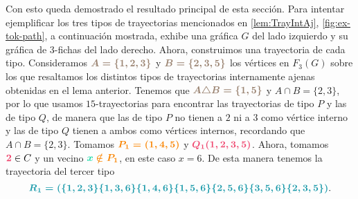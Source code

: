 Con esto queda demostrado el resultado principal de esta secci\'on. Para
intentar ejemplificar los tres tipos de trayectorias mencionados en
\cref{lem:TrayIntAj}, \cref{fig:ex-tok-path}, a continuaci\'on mostrada, exhibe
una gr\'afica $G$ del lado izquierdo y su gr\'afica de $3$-fichas del lado
derecho. Ahora, construimos una trayectoria de cada tipo. Consideramos
${\color{baige}\boldsymbol {A= \{1,2,3\}}}$ y ${\color{baige}\boldsymbol
{B=\{2,3,5\}}}$ los v\'ertices en $F_3(G)$ sobre los que resaltamos los
distintos tipos de trayectorias internamente ajenas obtenidas en el lema
anterior. Tenemos que ${\color{baige} \boldsymbol {A\triangle B=\{1,5\}}}$ y
$A\cap B=\{2,3\}$, por lo que usamos $15$-trayectorias para encontrar las
trayectorias de tipo $P$ y las de tipo $Q$, de manera que las de tipo $P$ no
tienen a $2$ ni a $3$ como v\'ertice interno y las de tipo $Q$ tienen a ambos
como v\'ertices internos, recordando que $A\cap B=\{2,3\}$. Tomamos
${\color{naranja}\boldsymbol {P_1=(1,4,5)}}$ y ${\color{fushia}\boldsymbol
{Q_1(1,2,3,5)}}$. Ahora, tomamos ${\color{fushia}\boldsymbol {2}} \in C$ y un
vecino ${\color{menta}\boldsymbol {x} \color{naranja}\boldsymbol {\notin P_1}}$,
en este caso $x=6$. De esta manera tenemos la trayectoria del tercer tipo
\[
    {\color{verdeAzulado}\boldsymbol {R_1=(\{1,2,3\}\{1,3,6\}\{1,4,6\}\{1,5,6\}\{2,5,6\}
    \{3,5,6\}\{2,3,5\})}}.
\]

